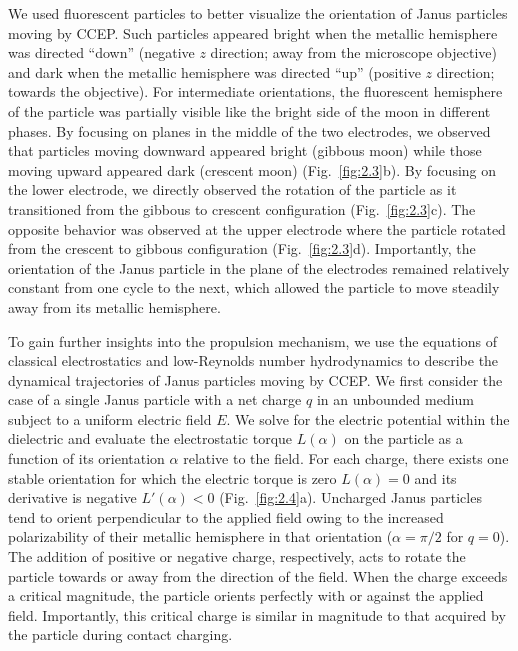 We used fluorescent particles to better visualize the orientation of Janus particles moving by CCEP.  
Such particles appeared bright when the metallic hemisphere was directed ``down'' (negative $z$ direction; away from the microscope objective) and dark when the metallic hemisphere was directed ``up'' (positive $z$ direction; towards the objective). 
For intermediate orientations, the fluorescent hemisphere of the particle was partially visible like the bright side of the moon in different phases.
By focusing on planes in the middle of the two electrodes, we observed that particles moving downward appeared bright (gibbous moon) while those moving upward appeared dark (crescent moon) (Fig.~\ref{fig:2.3}b).
By focusing on the lower electrode, we directly observed the rotation of the particle as it transitioned from the gibbous to crescent configuration (Fig.~\ref{fig:2.3}c).  
The opposite behavior was observed at the upper electrode where the particle rotated from the crescent to gibbous configuration (Fig.~\ref{fig:2.3}d).
Importantly, the orientation of the Janus particle in the plane of the electrodes remained relatively constant from one cycle to the next, which allowed the particle to move steadily away from its metallic hemisphere.   

To gain further insights into the propulsion mechanism, we use the equations of classical electrostatics and low-Reynolds number hydrodynamics to describe the dynamical trajectories of Janus particles moving by CCEP.
We first consider the case of a single Janus particle with a net charge $q$ in an unbounded medium subject to a uniform electric field $E$.
We solve for the electric potential within the dielectric and evaluate the electrostatic torque $L(\alpha)$ on the particle as a function of its orientation $\alpha$ relative to the field.
For each charge, there exists one stable orientation for which the electric torque is zero $L(\alpha)=0$ and its derivative is negative $L'(\alpha)<0$ (Fig.~\ref{fig:2.4}a).
Uncharged Janus particles tend to orient perpendicular to the applied field owing to the increased polarizability of their metallic hemisphere in that orientation ($\alpha=\pi/2$ for $q=0$).
The addition of positive or negative charge, respectively, acts to rotate the particle towards or away from the direction of the field.
When the charge exceeds a critical magnitude, the particle orients perfectly with or against the applied field.
Importantly, this critical charge is similar in magnitude to that acquired by the particle during contact charging. 

